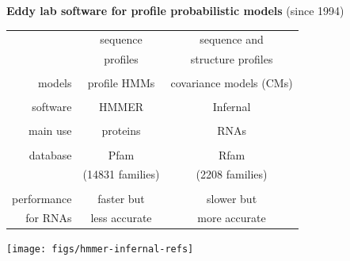 \documentclass[landscape]{slides}
\begin{document}
\begin{slide}
\begin{center}
\textbf{Eddy lab software for profile probabilistic models} (since 1994)
\end{center}
\medskip

\begin{center}
\small
\begin{tabular}{r|cc} 
             & sequence & sequence and \\
             & profiles & structure profiles \\ \hline
  \\
  models     & profile HMMs     & {\color{red} covariance models (CMs)} \\ 
  \\
  software   & {\sc HMMER}      & {\sc Infernal} \\ 
  \\
  main use   & proteins         & RNAs \\ 
  \\
  database   & {\sc Pfam}       & {\sc Rfam} \\
             & (14831 families) & (2208 families) \\
  \\
  performance& faster but    & slower but    \\
  for RNAs   & less accurate & more accurate \\
\end{tabular}

\hspace{1.2in}\texttt{[image: figs/hmmer-infernal-refs]}

\end{center}

\vfill

\end{slide}
\end{document}
